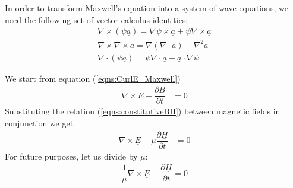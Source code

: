 \documentclass[12pt,twoside]{article}
\begin{document}
In order to transform Maxwell's equation into a system of wave equations, we need the following set of vector calculus identities:
\begin{subequations}
\label{eqns:vectorCalcIDs}
	\begin{align}
			\nabla \times (\psi \underline{a}) = \nabla \psi \times 	
			\underline{a} + \psi \nabla \times \underline{a}  \label{eqns:ProdCurlID}\\
		\nabla \times \nabla \times \underline{a} = \nabla ( \nabla
			 \cdot \underline{a} ) - \nabla^2\underline{a} \label{eqns:CurlCurlID}\\
		\nabla \cdot (\psi \underline{a}) = \psi \nabla \cdot \underline{a}
			 + \underline{a} \cdot \nabla \psi \label{eqns:DivProdID}
			\end{align}
\end{subequations}

We start from equation (\ref{eqns:CurlE_Maxwell})
\begin{align*}
\nabla \times \underline{E} + \dfrac{\partial \underline{B}}{\partial t}&= 0
\end{align*}
Substituting the relation (\ref{eqns:constitutiveBH}) between magnetic fields in conjunction we get
\begin{align*}
\nabla \times \underline{E} + \mu \dfrac{\partial  \underline{H}}{\partial t}&= 0
\end{align*}
For future purposes, let us divide by $\mu$:
\begin{align*}
\dfrac{1}{\mu} \nabla \times \underline{E} + \dfrac{\partial \underline{H}}{\partial t} = 0
\end{align*}
\end{document}
